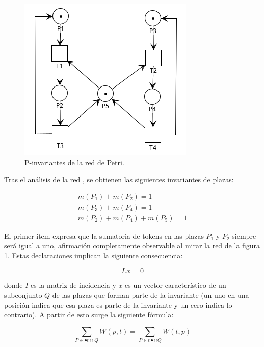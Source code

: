 \begin{figure}[H]
	\centering
	\includegraphics[scale=0.8]{Figures/marco teorico/imag7.png}
	\caption{P-invariantes de la red de Petri.}
	\label{fig:rdp2.7_p-invariante}
  \end{figure}
 
 \noindent Tras el análisis de la red , se obtienen las siguientes invariantes de plazas:
 
 \begin{equation}
    \begin{array}{cc}
        m(P_1) + m(P_2) = 1  \\
        m(P_3) + m(P_4) = 1   \\
        m(P_2) + m(P_4) + m(P_5) = 1 
    \end{array}
 \end{equation}

El primer ítem expresa que la sumatoria de tokens en las plazas $P_1$ y $P_2$ siempre será igual a uno, afirmación completamente observable al mirar la red de la figura \ref{fig:rdp2.7_p-invariante}. Estas declaraciones implican la siguiente consecuencia:

\begin{equation}
    I . x = 0
\end{equation}

\noindent donde $I$ es la matriz de incidencia y $x$ es un vector característico de un subconjunto $Q$ de las plazas que forman parte de la invariante (un uno en una posición indica que esa plaza es parte de la invariante y un cero indica lo contrario). A partir de esto surge la siguiente fórmula:

\begin{equation}
    \sum_{P \in \bullet t \cap Q} W(p,t) = \sum_{P \in t \bullet \cap Q} W(t,p)
\end{equation}

